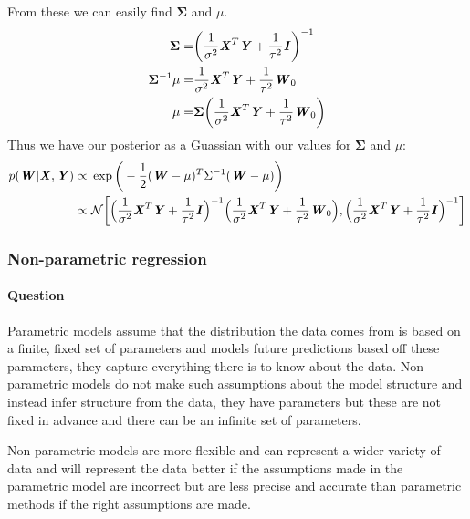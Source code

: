\documentclass{article}
\newcounter{question}
\newcommand{\question}{\stepcounter{question}\paragraph{Question \thequestion}}
\newcommand{\mat}[1]{\textbf{\textit{#1}}}
\begin{document}
From these we can easily find $\mathbf{\Sigma}$ and $\mu$.
\begin{align*}
	\mathbf{\Sigma} = &\bigg(\frac{1}{\sigma^2}\mat{X}^T\mat{Y}+\frac{1}{\tau^2}\mat{I}\bigg)^{-1} \\
	\mathbf{\Sigma}^{-1}\mu = &\frac{1}{\sigma^2}\mat{X}^T\mat{Y} + \frac{1}{\tau^2}\mat{W}_0 \\
	\mu = &\mathbf{\Sigma}\bigg(\frac{1}{\sigma^2}\mat{X}^T\mat{Y} + \frac{1}{\tau^2}\mat{W}_0\bigg) \\
\end{align*}
Thus we have our posterior as a Guassian with our values for $\mathbf{\Sigma}$ and $\mu$:
\begin{align*}
	p(\mat{W}|\mat{X},\mat{Y}) \propto\ &\exp\bigg(-\frac{1}{2}(\mat{W}-\mu)^T\Sigma^{-1}(\mat{W}-\mu)\bigg)\\
	\propto\ &\mathcal{N}\bigg[\Big(\frac{1}{\sigma^2}\mat{X}^T\mat{Y}+\frac{1}{\tau^2}\mat{I}\Big)^{-1}\Big(\frac{1}{\sigma^2}\mat{X}^T\mat{Y} + \frac{1}{\tau^2}\mat{W}_0\Big),\Big(\frac{1}{\sigma^2}\mat{X}^T\mat{Y}+\frac{1}{\tau^2}\mat{I}\Big)^{-1}\bigg]
\end{align*}
\subsubsection{Non-parametric regression}
\question Parametric models assume that the distribution the data comes from is based on a finite, fixed set of parameters and models future predictions based off these parameters, they capture everything there is to know about the data. Non-parametric models do not make such assumptions about the model structure and instead infer structure from the data, they have parameters but these are not fixed in advance and there can be an infinite set of parameters.

Non-parametric models are more flexible and can represent a wider variety of data and will represent the data better if the assumptions made in the parametric model are incorrect but are less precise and accurate than parametric methods if the right assumptions are made.
\end{document}
